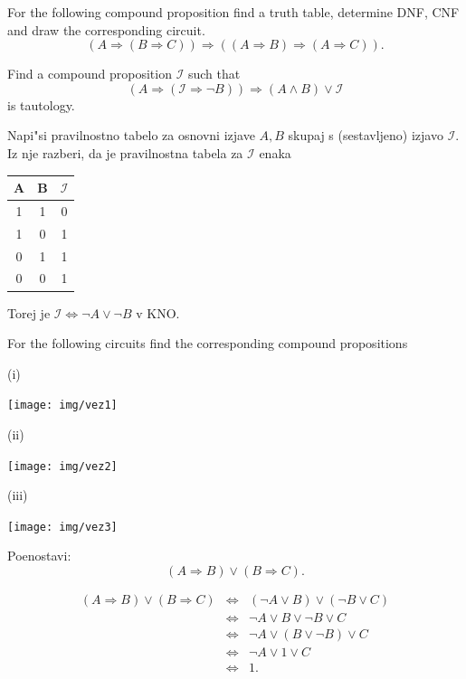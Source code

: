\documentclass[11pt,paper=b5,footinclude,headinclude]{scrbook} %
\newtheorem{ex}{Vaja\hypertarget{sol:\theex}}[chapter]
\begin{document}
\begin{ex} For the following compound proposition find  a truth table, determine DNF, CNF and draw the corresponding circuit.
$$
(A \Rightarrow (B\Rightarrow C)) \Rightarrow ((A\Rightarrow B)\Rightarrow (A \Rightarrow C)).
$$


\end{ex} \begin{ex} Find a compound proposition $\mathcal{I}$ such that
$$(A\Rightarrow (\mathcal{I} \Rightarrow \neg B))\Rightarrow (A\wedge B) \vee \mathcal{I}$$
is tautology.

\begin{sol}
Napi"si pravilnostno tabelo za osnovni izjave $A, B$ skupaj s (sestavljeno) izjavo $\mathcal{I}$. Iz nje razberi, da je pravilnostna tabela za $\mathcal{I}$ enaka
\begin{table}[ht!]
\centering
\begin{tabular}{c|c|c}
A & B & $\mathcal{I}$\\
\hline
1 & 1 & 0\\
1 & 0 & 1\\
0 & 1 & 1\\
0 & 0 & 1
\end{tabular}
\end{table}

Torej je $\mathcal{I} \Leftrightarrow \neg A \vee \neg B$ v KNO.
\end{sol}

\end{ex} \begin{ex} For the following circuits find the  corresponding compound propositions

\noindent (i)
\begin{center}
\texttt{[image: img/vez1]}
\end{center}
\noindent (ii)
\begin{center}
\texttt{[image: img/vez2]}
\end{center}
\noindent (iii)
\begin{center}
\texttt{[image: img/vez3]}
\end{center}

\end{ex}

\begin{ex}
Poenostavi:
$$(A\Rightarrow B) \vee (B \Rightarrow C).$$

\begin{sol}

\begin{eqnarray*}
(A\Rightarrow B) \vee (B \Rightarrow C) &\Leftrightarrow & (\neg A \vee B) \vee (\neg B \vee C)\\
&\Leftrightarrow & \neg A \vee B \vee \neg B \vee C\\
&\Leftrightarrow & \neg A \vee (B \vee \neg B) \vee C\\
&\Leftrightarrow & \neg A \vee 1 \vee C\\
&\Leftrightarrow & 1.
\end{eqnarray*}
 
\end{sol}
\end{ex}
\end{document}
